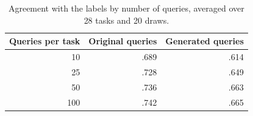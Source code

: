\begin{table}[t]
\centering\small
\begin{tabular}{rrr}
\toprule
Queries per task & Original queries & Generated queries \\
\midrule
10 & .689 & .614 \\
25 & .728 & .649 \\
50 & .736 & .663 \\
100 & .742 & .665 \\
\bottomrule
\end{tabular}
\caption{Agreement with the labels by number of queries, averaged over 28 tasks and 20 draws.}
\label{tab:num_queries}
\end{table}
